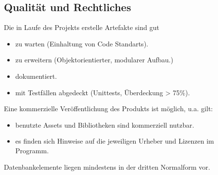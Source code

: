 \subsection{Qualität und Rechtliches}
\begin{requirements}
     Die in Laufe des Projekts erstelle Artefakte sind gut
    \begin{itemize}
        \item zu warten (Einhaltung von Code Standarts).
        \item zu erweitern (Objektorientierter, modularer Aufbau.)
        \item dokumentiert.
        \item mit Testfällen abgedeckt (Unittests, Überdeckung > 75\%).
    \end{itemize}
     Eine kommerzielle Veröffentlichung des Produkts ist möglich, u.a. gilt:
    \begin{itemize}
        \item benutzte Assets und Bibliotheken sind kommerziell nutzbar.
    	\item es finden sich Hinweise auf die jeweiligen Urheber und Lizenzen im Programm.
    \end{itemize}
     Datenbankelemente liegen mindestens in der dritten Normalform vor.
\end{requirements}
